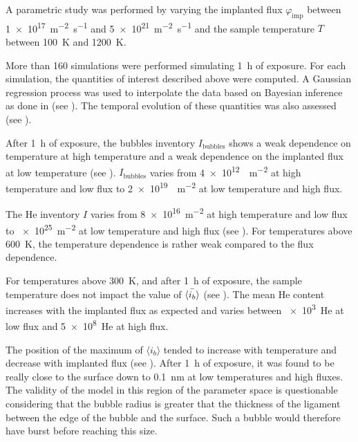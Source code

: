 A parametric study was performed by varying the implanted flux $\varphi_\mathrm{imp}$ between \SI{1e17}{m^{-2} s^{-1}} and \SI{5e21}{m^{-2} s^{-1}} and the sample temperature $T$ between \SI{100}{K} and \SI{1200}{K}.

More than 160 simulations were performed simulating \SI{1}{h} of exposure.
For each simulation, the quantities of interest described above were computed.
A Gaussian regression process  was used to interpolate the data based on Bayesian inference as done in  (see ).
The temporal evolution of these quantities was also assessed (see ).

After \SI{1}{h} of exposure, the bubbles inventory $I_\mathrm{bubbles}$ shows a weak dependence on temperature at high temperature and a weak dependence on the implanted flux at low temperature (see ).
$I_\mathrm{bubbles}$ varies from \SI{4e12}{ m^{-2}} at high temperature and low flux to \SI{2e19}{ m^{-2}} at low temperature and high flux.

The \gls{He} inventory $I$ varies from \SI{8e16}{m^{-2}} at high temperature and low flux to \SI{e25}{m^{-2}} at low temperature and high flux (see ).
For temperatures above \SI{600}{K}, the temperature dependence is rather weak compared to the flux dependence.

For temperatures above \SI{300}{K}, and after \SI{1}{h} of exposure, the sample temperature does not impact the value of $\Bar{\langle i_b \rangle}$ (see ).
The mean He content increases with the implanted flux as expected and varies between \SI{e3}{He} at low flux and \SI{5e8}{He} at high flux.

The position of the maximum of $\langle i_b \rangle$ tended to increase with temperature and decrease with implanted flux (see ).
After \SI{1}{h} of exposure, it was found to be really close to the surface down to \SI{0.1}{nm} at low temperatures and high fluxes.
The validity of the model in this region of the parameter space is questionable considering that the bubble radius is greater that the thickness of the ligament between the edge of the bubble and the surface.
Such a bubble would therefore have burst before reaching this size. 

